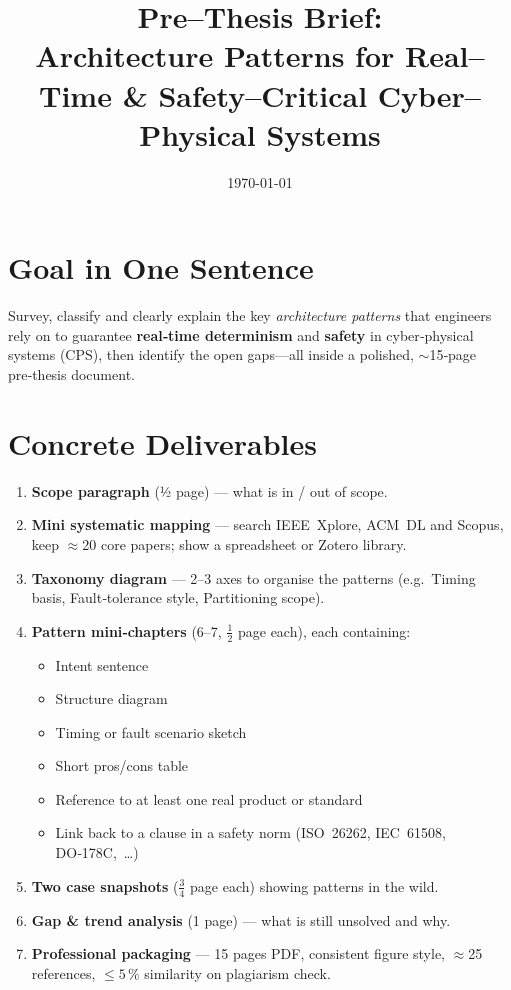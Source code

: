 \documentclass[11pt,a4paper]{article}
\title{Pre--Thesis Brief:\\\large Architecture Patterns for Real--Time \& Safety--Critical Cyber--Physical Systems}
\author{}
\date{\today}
\begin{document}
\maketitle

\section{Goal in One Sentence}
Survey, classify and clearly explain the key \emph{architecture patterns} that engineers rely on to guarantee \textbf{real‑time determinism} and \textbf{safety} in cyber‑physical systems (CPS), then identify the open gaps---all inside a polished, $\sim$15‑page pre‑thesis document.

\section{Concrete Deliverables}

\begin{enumerate}[label=\arabic*.]
  \item \textbf{Scope paragraph} (½ page) --- what is in / out of scope.
  \item \textbf{Mini systematic mapping} --- search IEEE Xplore, ACM DL and Scopus, keep $\approx$20 core papers; show a spreadsheet or Zotero library.
  \item \textbf{Taxonomy diagram} --- 2–3 axes to organise the patterns (e.g.\ Timing basis, Fault‑tolerance style, Partitioning scope).
  \item \textbf{Pattern mini‑chapters} (6--7, $\frac12$ page each), each containing:
        \begin{itemize}[nosep]
          \item Intent sentence
          \item Structure diagram
          \item Timing or fault scenario sketch
          \item Short pros/cons table
          \item Reference to at least one real product or standard
          \item Link back to a clause in a safety norm (ISO 26262, IEC 61508, DO‑178C,~\ldots)
        \end{itemize}
  \item \textbf{Two case snapshots} ($\frac34$ page each) showing patterns in the wild.
  \item \textbf{Gap \& trend analysis} (1 page) --- what is still unsolved and why.
  \item \textbf{Professional packaging} --- 15 pages PDF, consistent figure style, $\approx$25 references, $\leq{}5\,\%$ similarity on plagiarism check.
\end{enumerate}
\end{document}
